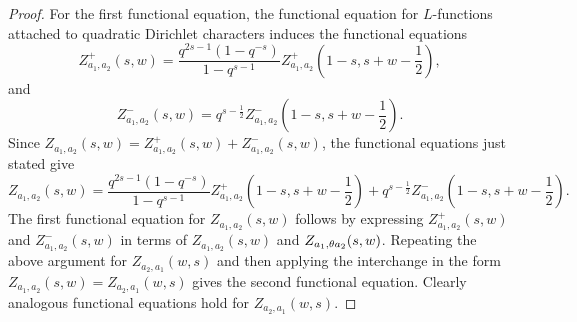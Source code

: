 \documentclass[12pt,reqno,oneside]{amsart}
\begin{document}
    \begin{proof}
        For the first functional equation, the functional equation for $L$-functions attached to quadratic Dirichlet characters induces the functional equations
        \[
            Z_{a_{1},a_{2}}^{+}(s,w) = \frac{q^{2s-1}(1-q^{-s})}{1-q^{s-1}}Z_{a_{1},a_{2}}^{+}\left(1-s,s+w-\frac{1}{2}\right),
        \]
        and
        \[
            Z_{a_{1},a_{2}}^{-}(s,w) = q^{s-\frac{1}{2}}Z_{a_{1},a_{2}}^{-}\left(1-s,s+w-\frac{1}{2}\right).
        \]
        Since $Z_{a_{1},a_{2}}(s,w) = Z_{a_{1},a_{2}}^{+}(s,w)+Z_{a_{1},a_{2}}^{-}(s,w)$, the functional equations just stated give
        \[
            Z_{a_{1},a_{2}}(s,w) = \frac{q^{2s-1}(1-q^{-s})}{1-q^{s-1}}Z_{a_{1},a_{2}}^{+}\left(1-s,s+w-\frac{1}{2}\right)+q^{s-\frac{1}{2}}Z_{a_{1},a_{2}}^{-}\left(1-s,s+w-\frac{1}{2}\right).
        \]
        The first functional equation for $Z_{a_{1},a_{2}}(s,w)$ follows by expressing $Z_{a_{1},a_{2}}^{+}(s,w)$ and $Z_{a_{1},a_{2}}^{-}(s,w)$ in terms of $Z_{a_{1},a_{2}}(s,w)$ and $Z_{a_{1},\theta a_{2}}(s,w)$. Repeating the above argument for $Z_{a_{2},a_{1}}(w,s)$ and then applying the interchange in the form $Z_{a_{1},a_{2}}(s,w) = Z_{a_{2},a_{1}}(w,s)$ gives the second functional equation. Clearly analogous functional equations hold for $Z_{a_{2},a_{1}}(w,s)$.
    \end{proof}
\end{document}
